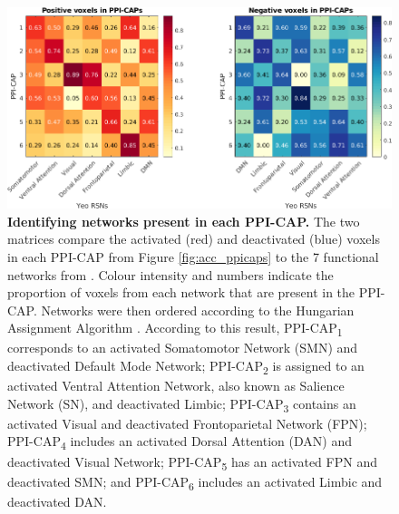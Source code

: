 \begin{figure}[h]
\centering
\includegraphics[width=1\textwidth]{images/Appendix/ACCK6_assigment_YeoRSN.png}
\caption{\textbf{Identifying networks present in each PPI-CAP.} The two matrices compare the activated (red) and deactivated (blue) voxels in each PPI-CAP from Figure \ref{fig:acc_ppicaps} to the 7 functional networks from \citet{Yeo2011}. Colour intensity and numbers indicate the proportion of voxels from each network that are present in the PPI-CAP. Networks were then ordered according to the Hungarian Assignment Algorithm \citep{Munkres1957}. According to this result, PPI-CAP\textsubscript{1} corresponds to an activated Somatomotor Network (SMN) and deactivated Default Mode Network;  PPI-CAP\textsubscript{2} is assigned to an activated Ventral Attention Network, also known as Salience Network (SN),  and deactivated Limbic; PPI-CAP\textsubscript{3} contains an activated Visual and deactivated Frontoparietal Network (FPN); PPI-CAP\textsubscript{4} includes an activated Dorsal Attention (DAN) and deactivated Visual Network; PPI-CAP\textsubscript{5} has an activated FPN and deactivated SMN; and PPI-CAP\textsubscript{6} includes an activated Limbic and deactivated DAN.  }
\label{fig:app_acc_munkres}
\end{figure}







